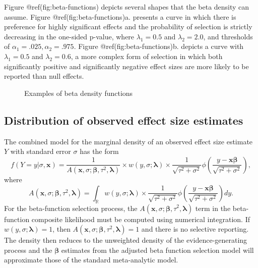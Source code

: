 \documentclass[
]{article}
\begin{document}
Figure @ref(fig:beta-functions) depicts several shapes that the beta
density can assume. Figure @ref(fig:beta-functions)a. presents a curve
in which there is preference for highly significant effects and the
probability of selection is strictly decreasing in the one-sided
p-value, where \(\lambda_1 = 0.5\) and \(\lambda_2 = 2.0\), and
thresholds of \(\alpha_1 = .025, \alpha_2 = .975\). Figure
@ref(fig:beta-functions)b. depicts a curve with \(\lambda_1 = 0.5\) and
\(\lambda_2 = 0.6\), a more complex form of selection in which both
significantly positive and significantly negative effect sizes are more
likely to be reported than null effects.

\begin{figure}[tb]
\caption{Examples of beta density functions}\label{fig:beta-functions}
\end{figure}

\subsection{Distribution of observed effect size
estimates}\label{distribution-of-observed-effect-size-estimates}

The combined model for the marginal density of an observed effect size
estimate \(Y\) with standard error \(\sigma\) has the form
\begin{equation}
\label{eq:generic-selection}
f(Y = y | \sigma, \mathbf{x}) = \frac{1}{A(\mathbf{x}, \sigma; \boldsymbol\beta, \tau^2, \boldsymbol\lambda)} \times w\left(y, \sigma; \boldsymbol\lambda \right) \times \frac{1}{\sqrt{\tau^2 + \sigma^2}} \phi\left(\frac{y - \mathbf{x} \boldsymbol\beta}{\sqrt{\tau^2 + \sigma^2}}\right),
\end{equation} where \begin{equation}
\label{eq:generic-selection-A}
A(\mathbf{x}, \sigma; \boldsymbol\beta, \tau^2, \boldsymbol\lambda) =  \int_\mathbb{R} w\left(y, \sigma; \boldsymbol\lambda \right) \times  \frac{1}{\sqrt{\tau^2 + \sigma^2}}\phi\left(\frac{y - \mathbf{x}\boldsymbol\beta}{\sqrt{\tau^2 + \sigma^2}}\right) dy.
\end{equation} For the beta-function selection process, the
\(A(\mathbf{x}, \sigma; \boldsymbol\beta, \tau^2, \boldsymbol\lambda)\)
term in the beta-function composite likelihood must be computed using
numerical integration. If \(w(y, \sigma; \boldsymbol\lambda) = 1\), then
\(A(\mathbf{x}, \sigma; \boldsymbol\beta, \tau^2, \boldsymbol\lambda) = 1\)
and there is no selective reporting. The density then reduces to the
unweighted density of the evidence-generating process and the
\(\boldsymbol\beta\) estimates from the adjusted beta function selection
model will approximate those of the standard meta-analytic model.
\end{document}
